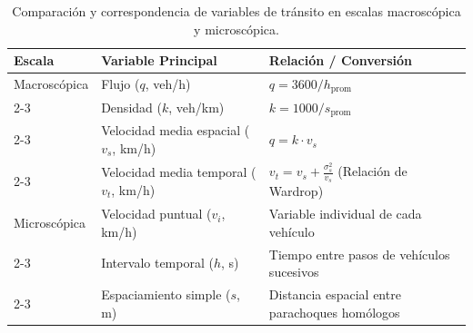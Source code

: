 \begin{table}[H]
\centering
\caption{Comparación y correspondencia de variables de tránsito en escalas macroscópica y microscópica.}
\label{tab:variables_transito}
\setlength{\tabcolsep}{4pt}
\begin{tabular}{|p{2.3cm}|p{4.0cm}|p{5.4cm}|}
\hline
\textbf{Escala} & \textbf{Variable Principal} & \textbf{Relación / Conversión} \\ \hline
Macroscópica & Flujo ($q$, veh/h) & $q = 3600 / h_{\text{prom}}$ \\ \cline{2-3}
 & Densidad ($k$, veh/km) & $k = 1000 / s_{\text{prom}}$ \\ \cline{2-3}
 & Velocidad media espacial ($v_s$, km/h) & $q = k \cdot v_s$ \\ \cline{2-3}
 & Velocidad media temporal ($v_t$, km/h) & $v_t = v_s + \frac{\sigma_s^2}{v_s}$ (Relación de Wardrop) \\ \hline
Microscópica & Velocidad puntual ($v_i$, km/h) & Variable individual de cada vehículo \\ \cline{2-3}
 & Intervalo temporal ($h$, s) & Tiempo entre pasos de vehículos sucesivos \\ \cline{2-3}
 & Espaciamiento simple ($s$, m) & Distancia espacial entre parachoques homólogos \\ \hline
\end{tabular}
\end{table}

